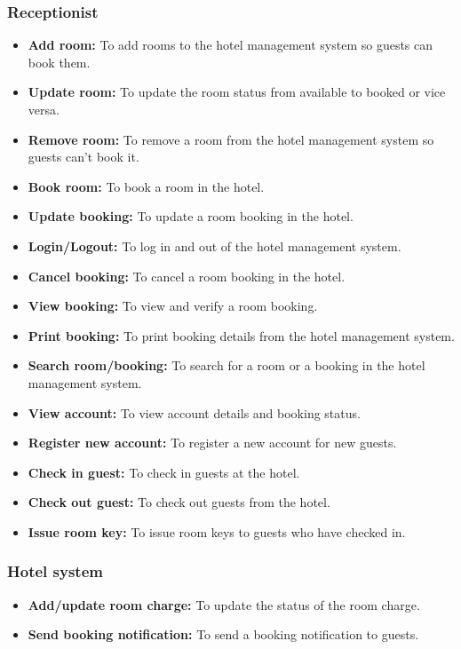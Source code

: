 \subsubsection{Receptionist}\label{5-x4CLbjj7ZUbtKgbppuo}

\begin{itemize}
\item
\textbf{Add room:} To add rooms to the hotel management system so guests can book them.
\item
\textbf{Update room:} To update the room status from available to booked or vice versa.
\item
\textbf{Remove room:} To remove a room from the hotel management system so guests can't book it.
\item
\textbf{Book room:} To book a room in the hotel.
\item
\textbf{Update booking:} To update a room booking in the hotel.
\item
\textbf{Login/Logout:} To log in and out of the hotel management system.
\item
\textbf{Cancel booking:} To cancel a room booking in the hotel.
\item
\textbf{View booking:} To view and verify a room booking.
\item
\textbf{Print booking:} To print booking details from the hotel management system.
\item
\textbf{Search room/booking:} To search for a room or a booking in the hotel management system.
\item
\textbf{View account:} To view account details and booking status.
\item
\textbf{Register new account:} To register a new account for new guests.
\item
\textbf{Check in guest:} To check in guests at the hotel.
\item
\textbf{Check out guest:} To check out guests from the hotel.
\item
\protect{}\label{7k-xx1QbzEBTCTpTVUpWM}
\textbf{Issue room key:} To issue room keys to guests who have checked in.
\end{itemize}

\subsubsection{Hotel system}\label{q-YA-5v4t9OdOb_2aMWqV}

\begin{itemize}
\item
\textbf{Add/update room charge:} To update the status of the room charge.
\item
\protect{}\label{CbQE0NzQ2i5cGZsD3EMPR}
\textbf{Send booking notification:} To send a booking notification to guests.
\end{itemize}

